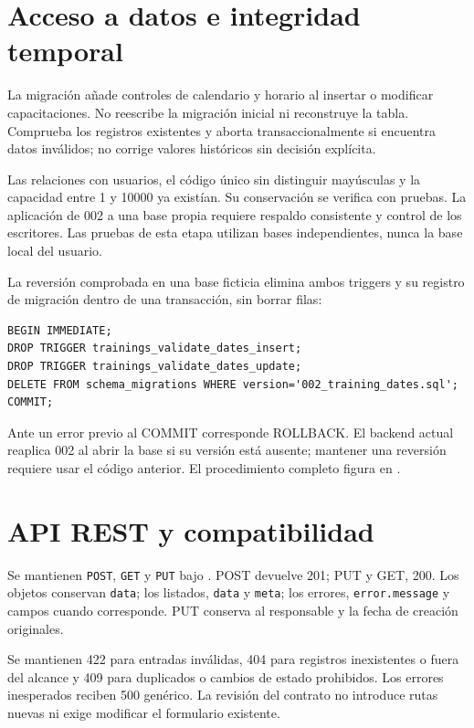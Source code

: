 \section{Acceso a datos e integridad temporal}
La migración  añade controles de calendario y horario al insertar o modificar capacitaciones. No reescribe la migración inicial ni reconstruye la tabla. Comprueba los registros existentes y aborta transaccionalmente si encuentra datos inválidos; no corrige valores históricos sin decisión explícita.

Las relaciones con usuarios, el código único sin distinguir mayúsculas y la capacidad entre 1 y 10000 ya existían. Su conservación se verifica con pruebas. La aplicación de 002 a una base propia requiere respaldo consistente y control de los escritores. Las pruebas de esta etapa utilizan bases independientes, nunca la base local del usuario.

La reversión comprobada en una base ficticia elimina ambos triggers y su registro de migración dentro de una transacción, sin borrar filas:
\begin{lstlisting}[language={},caption={Reversión de la migración 002 en una conexión controlada}]
BEGIN IMMEDIATE;
DROP TRIGGER trainings_validate_dates_insert;
DROP TRIGGER trainings_validate_dates_update;
DELETE FROM schema_migrations WHERE version='002_training_dates.sql';
COMMIT;
\end{lstlisting}
Ante un error previo al COMMIT corresponde ROLLBACK. El backend actual reaplica 002 al abrir la base si su versión está ausente; mantener una reversión requiere usar el código anterior. El procedimiento completo figura en .

\section{API REST y compatibilidad}
Se mantienen \texttt{POST}, \texttt{GET} y \texttt{PUT} bajo . POST devuelve 201; PUT y GET, 200. Los objetos conservan \texttt{data}; los listados, \texttt{data} y \texttt{meta}; los errores, \texttt{error.message} y campos cuando corresponde. PUT conserva al responsable y la fecha de creación originales.

Se mantienen 422 para entradas inválidas, 404 para registros inexistentes o fuera del alcance y 409 para duplicados o cambios de estado prohibidos. Los errores inesperados reciben 500 genérico. La revisión del contrato no introduce rutas nuevas ni exige modificar el formulario existente.

